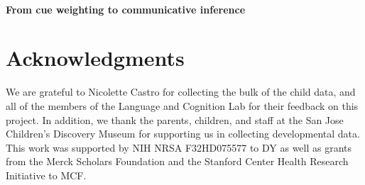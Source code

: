 \documentclass[man,floatsintext]{apa6}
\begin{document}
\paragraph{From cue weighting to communicative inference}

\section{Acknowledgments}

We are grateful to Nicolette Castro for collecting the bulk of the child data, and all of the members of the Language and Cognition Lab for their feedback on this project. In addition, we thank the parents, children, and staff at the San Jose Children's Discovery Museum for supporting us in collecting developmental data. This work was supported by NIH NRSA F32HD075577 to DY as well as grants from the Merck Scholars Foundation and the Stanford Center Health Research Initiative to MCF.



\end{document}
